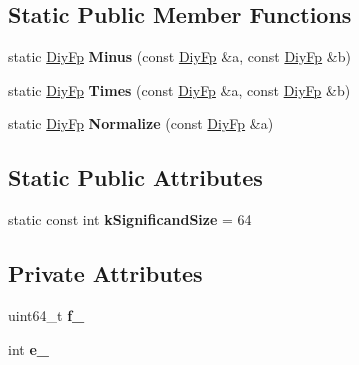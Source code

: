 \subsection*{Static Public Member Functions}
\begin{DoxyCompactItemize}
\item 
static \hyperlink{classv8_1_1internal_1_1_diy_fp}{Diy\+Fp} {\bfseries Minus} (const \hyperlink{classv8_1_1internal_1_1_diy_fp}{Diy\+Fp} \&a, const \hyperlink{classv8_1_1internal_1_1_diy_fp}{Diy\+Fp} \&b)\hypertarget{classv8_1_1internal_1_1_diy_fp_a3f8e81ff6c13ae8b5935a0ec5acfcf2f}{}\label{classv8_1_1internal_1_1_diy_fp_a3f8e81ff6c13ae8b5935a0ec5acfcf2f}

\item 
static \hyperlink{classv8_1_1internal_1_1_diy_fp}{Diy\+Fp} {\bfseries Times} (const \hyperlink{classv8_1_1internal_1_1_diy_fp}{Diy\+Fp} \&a, const \hyperlink{classv8_1_1internal_1_1_diy_fp}{Diy\+Fp} \&b)\hypertarget{classv8_1_1internal_1_1_diy_fp_a92c31f86fc66d3f38b210dd116bc444a}{}\label{classv8_1_1internal_1_1_diy_fp_a92c31f86fc66d3f38b210dd116bc444a}

\item 
static \hyperlink{classv8_1_1internal_1_1_diy_fp}{Diy\+Fp} {\bfseries Normalize} (const \hyperlink{classv8_1_1internal_1_1_diy_fp}{Diy\+Fp} \&a)\hypertarget{classv8_1_1internal_1_1_diy_fp_a379331248231f685a0c4c039f4bd4173}{}\label{classv8_1_1internal_1_1_diy_fp_a379331248231f685a0c4c039f4bd4173}

\end{DoxyCompactItemize}
\subsection*{Static Public Attributes}
\begin{DoxyCompactItemize}
\item 
static const int {\bfseries k\+Significand\+Size} = 64\hypertarget{classv8_1_1internal_1_1_diy_fp_a751e7d05584e45570106af4828453393}{}\label{classv8_1_1internal_1_1_diy_fp_a751e7d05584e45570106af4828453393}

\end{DoxyCompactItemize}
\subsection*{Private Attributes}
\begin{DoxyCompactItemize}
\item 
uint64\+\_\+t {\bfseries f\+\_\+}\hypertarget{classv8_1_1internal_1_1_diy_fp_a87ae78394e4a60f2ea6714a1481881e6}{}\label{classv8_1_1internal_1_1_diy_fp_a87ae78394e4a60f2ea6714a1481881e6}

\item 
int {\bfseries e\+\_\+}\hypertarget{classv8_1_1internal_1_1_diy_fp_a937df40c550fedb97ab460f15ab4f201}{}\label{classv8_1_1internal_1_1_diy_fp_a937df40c550fedb97ab460f15ab4f201}

\end{DoxyCompactItemize}

